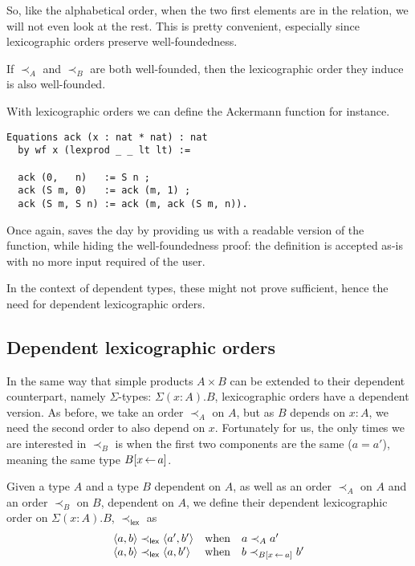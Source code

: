 So, like the alphabetical order, when the two first elements are in the
relation, we will not even look at the rest.
This is pretty convenient, especially since lexicographic orders preserve
well-foundedness.

\begin{lemma}
  If \(\prec_A\) and \(\prec_B\) are both well-founded, then the lexicographic
  order they induce is also well-founded.
\end{lemma}

With lexicographic orders we can define the Ackermann function for instance.
\begin{verbatim}
Equations ack (x : nat * nat) : nat
  by wf x (lexprod _ _ lt lt) :=

  ack (0,   n)   := S n ;
  ack (S m, 0)   := ack (m, 1) ;
  ack (S m, S n) := ack (m, ack (S m, n)).
\end{verbatim}
Once again, \Equations saves the day by providing us with a readable version of
the function, while hiding the well-foundedness proof: the definition is
accepted as-is with no more input required of the user.

In the context of dependent types, these might not prove sufficient, hence the
need for dependent lexicographic orders.

\subsection{Dependent lexicographic orders}

In the same way that simple products \(A \times B\) can be extended to their
dependent counterpart, namely \(\Sigma\)-types: \(\Sigma (x:A). B\),
lexicographic orders have a dependent version.
As before, we take an order \(\prec_A\) on \(A\), but as \(B\) depends on
\(x : A\), we need the second order to also depend on \(x\). Fortunately for us,
the only times we are interested in \(\prec_B\) is when the first two components
are the same (\(a = a'\)), meaning the same type \(B[x \mathop{\leftarrow} a]\).

\begin{definition}
  Given a type \(A\) and a type \(B\) dependent on \(A\), as well as an order
  \(\prec_A\) on \(A\) and an order \(\prec_B\) on \(B\), dependent on \(A\),
  we define their dependent lexicographic order on \(\Sigma (x:A). B\),
  \(\prec_{\mathsf{lex}}\) as
  \[
    \begin{array}{lcl}
      \langle a,b \rangle \prec_{\mathsf{lex}} \langle a',b' \rangle &\text{when}&
      a \prec_A a' \\
      \langle a,b \rangle \prec_{\mathsf{lex}} \langle a,b' \rangle &\text{when}&
      b \prec_{B[x \mathop{\leftarrow} a]} b'
    \end{array}
  \]
\end{definition}

